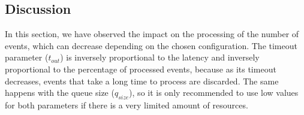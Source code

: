 \subsection{Discussion}
In this section, we have observed the impact on the processing of the number of events, which can decrease depending on the chosen configuration. The timeout parameter ($t_{out}$) is inversely proportional to the latency and inversely proportional to the percentage of processed events, because as its timeout decreases, events that take a long time to process are discarded. The same happens with the queue size ($q_{size}$), so it is only recommended to use low values for both parameters if there is a very limited amount of resources.